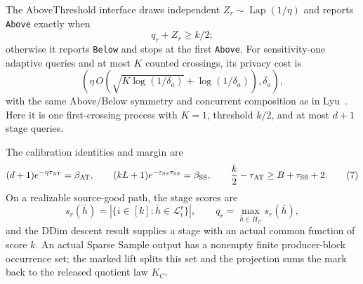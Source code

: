 \begin{proposition}
The AboveThreshold interface draws independent
\(Z_r\sim\operatorname{Lap}(1/\eta)\) and reports \texttt{Above} exactly
when
\[
 q_r+Z_r\geq k/2;
 \tag{6}
\]
otherwise it reports \texttt{Below} and stops at the first \texttt{Above}.
For sensitivity-one adaptive queries and at most \(K\) counted crossings,
its privacy cost is
\[
 \left(\eta\,O(\sqrt{K\log(1/\delta_a)}+\log(1/\delta_a)),
 \delta_a\right),
\]
with the same Above/Below symmetry and concurrent composition as in
Lyu~\citep{lyu2025}.  Here it is one first-crossing process with \(K=1\),
threshold \(k/2\), and at most \(d+1\) stage queries.

The calibration identities and margin are
\[
 (d+1)e^{-\eta\tau_{\rm AT}}=\beta_{\rm AT},
 \qquad
 (kL+1)e^{-\varepsilon_{\rm SS}\tau_{\rm SS}}=\beta_{\rm SS},
 \qquad
 \frac{k}{2}-\tau_{\rm AT}\geq B+\tau_{\rm SS}+2.
 \tag{7}
\]
On a realizable source-good path, the stage scores are
\[
 s_r(\bar h)=|\{i\in[k]:\bar h\in\mathcal L_i^r\}|,
 \qquad q_r=\max_{\bar h\in H_C}s_r(\bar h),
\]
and the DDim descent result supplies a stage with an actual common
function of score \(k\).  An actual Sparse Sample output has a nonempty
finite producer-block occurrence set; the marked lift splits this set and
the projection sums the mark back to the released quotient law \(K_C\).
\end{proposition}

